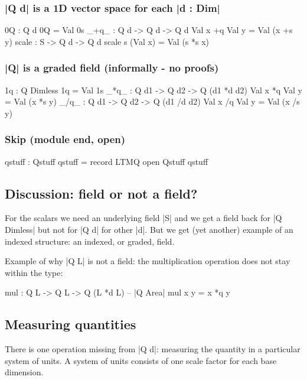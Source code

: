 \documentclass{article}
\begin{document}
\subsubsection{|Q d| is a 1D vector space for each |d : Dim|}
\label{sec:orgf183c4d}
\begin{code}
    0Q : Q d
    0Q = Val 0s
    _+q_ : Q d  -> Q d  -> Q d
    Val x +q Val y = Val (x +s y)
    scale : S -> Q d -> Q d
    scale s (Val x) = Val (s *s x)
\end{code}
\subsubsection{|Q| is a graded field (informally - no proofs)}
\label{sec:orgb5405e9}
\begin{code}
    1q  : Q Dimless
    1q = Val 1s
    _*q_ : Q d1 -> Q d2 -> Q (d1 *d d2)
    Val x *q Val y = Val (x *s y)
    _/q_ : Q d1 -> Q d2 -> Q (d1 /d d2)
    Val x /q Val y = Val (x /s y)
\end{code}
\subsubsection{Skip (module end, open)}
\label{sec:orgcc8d37a}
\begin{code}
  qstuff : Qstuff
  qstuff = record { LTMQ }
  open Qstuff qstuff
\end{code}

\subsection{Discussion: field or not a field?}
\label{sec:orgb7e65ef}
For the scalars we need an underlying field |S| and we get a field
back for |Q Dimless| but not for |Q d| for other |d|. But we get (yet
another) example of an indexed structure: an indexed, or graded, field.

Example of why |Q L| is not a field: the multiplication operation
does not stay within the type:

\begin{code}
  mul : Q L -> Q L -> Q (L *d L) -- |Q Area|
  mul x y = x *q y
\end{code}

\subsection{Measuring quantities}
\label{sec:org89b80dd}

There is one operation missing from |Q d|: measuring the quantity in a
particular system of units. A system of units consists of one scale
factor for each base dimension.
\end{document}
